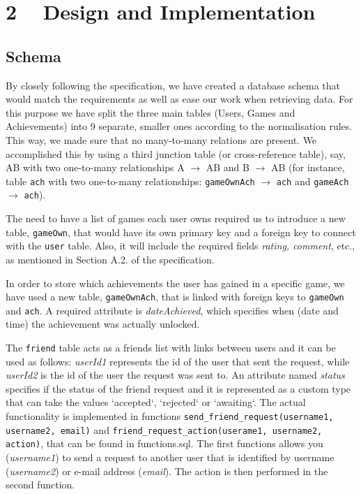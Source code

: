 \documentclass{article}
\begin{document}

\section{2 ~  Design and Implementation}
\subsection{Schema}
\par{By closely following the specification, we have created a database schema that would match the requirements as well as ease our work when retrieving data. For this purpose we have split the three main tables (Users, Games and Achievements) into 9 separate, smaller ones according to the normalisation rules. This way, we made sure that no many-to-many relations are present. We accomplished this by using a third junction table (or cross-reference table), say, AB with two one-to-many relationships A $\rightarrow$ AB and B $\rightarrow$ AB (for instance, table \texttt{ach} with two one-to-many relationships: \texttt{gameOwnAch} $\rightarrow$ \texttt{ach} and \texttt{gameAch} $\rightarrow$ \texttt{ach}).}\\

\par{The need to have a list of games each user owns required us to introduce a new table, \texttt{gameOwn}, that would have its own primary key and a foreign key to connect with the \texttt{user} table. Also, it will include the required fields \emph{rating, comment}, etc., as mentioned in Section A.2. of the specification.}\\

\par {In order to store which achievements the user has gained in a specific game, we have used a new table, \texttt{gameOwnAch}, that is linked with foreign keys to \texttt{gameOwn} and \texttt{ach}. A required attribute is \emph{dateAchieved}, which specifies when (date and time) the achievement was actually unlocked.}\\

\par {The \texttt{friend} table acts as a friends list with links between users and it can be used as follows: \emph{userId1} represents the id of the user that sent the request, while \emph{userId2} is the id of the user the request was sent to. An attribute named \emph{status} specifies if the status of the friend request and it is represented as a custom type that can take the values `accepted`, `rejected` or `awaiting`. The actual functionality is implemented in functions \texttt{send\_friend\_request(username1, username2, email)} and \texttt{friend\_request\_action(userame1, username2, action)}, that can be found in functions.sql. The first functions allows you (\emph{username1}) to send a request to another user that is identified by username (\emph{username2}) or e-mail address (\emph{email}). The action is then performed in the second function.}\\
\end{document}
